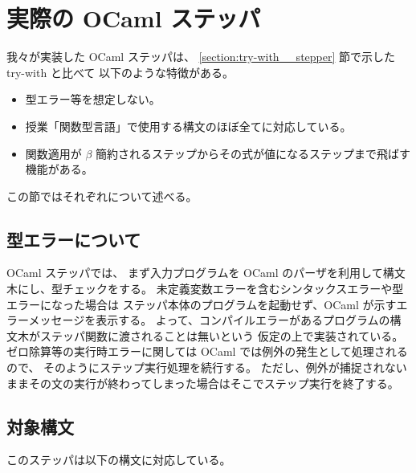\section{実際の OCaml ステッパ}
\label{section:ocaml stepper}

我々が実装した OCaml ステッパは、
\ref{section:try-with__stepper} 節で示した try-with と比べて
以下のような特徴がある。

\begin{itemize}
\item 型エラー等を想定しない。
\item 授業「関数型言語」で使用する構文のほぼ全てに対応している。
\item 関数適用が $\beta$ 簡約されるステップからその式が値になるステップまで飛ばす機能がある。
\end{itemize}

この節ではそれぞれについて述べる。

\subsection{型エラーについて}
\label{subsection:stepper__type}

OCaml ステッパでは、
まず入力プログラムを OCaml のパーザを利用して構文木にし、型チェックをする。
未定義変数エラーを含むシンタックスエラーや型エラーになった場合は
ステッパ本体のプログラムを起動せず、OCaml が示すエラーメッセージを表示する。
よって、コンパイルエラーがあるプログラムの構文木がステッパ関数に渡されることは無いという
仮定の上で実装されている。
ゼロ除算等の実行時エラーに関しては OCaml では例外の発生として処理されるので、
そのようにステップ実行処理を続行する。
ただし、例外が捕捉されないままその文の実行が終わってしまった場合はそこでステップ実行を終了する。

\subsection{対象構文}
\label{subsection:stepper__syntax}
このステッパは以下の構文に対応している。

